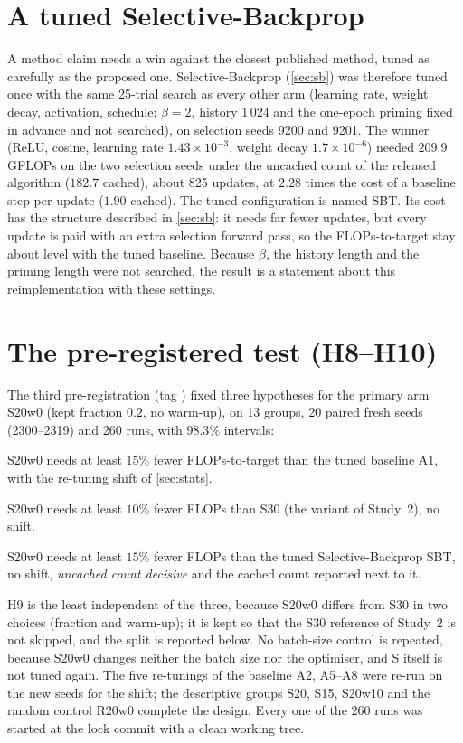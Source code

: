 \section{A tuned Selective-Backprop}\label{sec:sb-cost}
A method claim needs a win against the closest published method, tuned as carefully as the proposed one. Selective-Backprop (\cref{sec:sb}) was therefore tuned once with the same 25-trial search as every other arm (learning rate, weight decay, activation, schedule; $\beta=2$, history 1\,024 and the one-epoch priming fixed in advance and not searched), on selection seeds 9200 and 9201. The winner (ReLU, cosine, learning rate $1.43\times10^{-3}$, weight decay $1.7\times10^{-6}$) needed $209.9$ GFLOPs on the two selection seeds under the uncached count of the released algorithm ($182.7$ cached), about 825 updates, at $2.28$ times the cost of a baseline step per update ($1.90$ cached). The tuned configuration is named SBT. Its cost has the structure described in \cref{sec:sb}: it needs far fewer updates, but every update is paid with an extra selection forward pass, so the FLOPs-to-target stay about level with the tuned baseline. Because $\beta$, the history length and the priming length were not searched, the result is a statement about this reimplementation with these settings.

\section{The pre-registered test (H8--H10)}\label{sec:s3-prereg}
The third pre-registration (tag ) fixed three hypotheses for the primary arm S20w0 (kept fraction $0.2$, no warm-up), on 13 groups, 20 paired fresh seeds (2300--2319) and 260 runs, with $98.3\%$ intervals:
\begin{description}[leftmargin=2.6em,style=nextline]
\item[H8] S20w0 needs at least $15\%$ fewer FLOPs-to-target than the tuned baseline A1, with the re-tuning shift of \cref{sec:stats}.
\item[H9] S20w0 needs at least $10\%$ fewer FLOPs than S30 (the variant of Study~2), no shift.
\item[H10] S20w0 needs at least $15\%$ fewer FLOPs than the tuned Selective-Backprop SBT, no shift, \emph{uncached count decisive} and the cached count reported next to it.
\end{description}
H9 is the least independent of the three, because S20w0 differs from S30 in two choices (fraction and warm-up); it is kept so that the S30 reference of Study~2 is not skipped, and the split is reported below. No batch-size control is repeated, because S20w0 changes neither the batch size nor the optimiser, and S itself is not tuned again. The five re-tunings of the baseline A2, A5--A8 were re-run on the new seeds for the shift; the descriptive groups S20, S15, S20w10 and the random control R20w0 complete the design. Every one of the 260 runs was started at the lock commit with a clean working tree.


